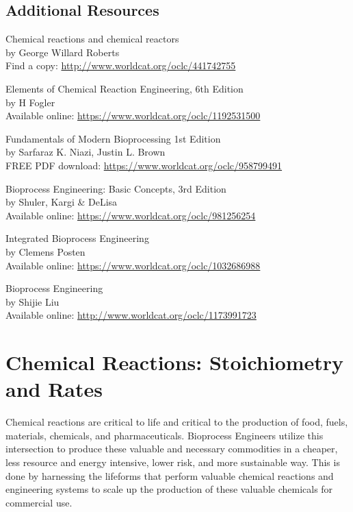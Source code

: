 \documentclass[
]{article}
\begin{document}
\hypertarget{additional-resources}{%
\subsection{Additional Resources}\label{additional-resources}}

Chemical reactions and chemical reactors\\
by George Willard Roberts\\
Find a copy: \url{http://www.worldcat.org/oclc/441742755}

Elements of Chemical Reaction Engineering, 6th Edition\\
by H Fogler\\
Available online: \url{https://www.worldcat.org/oclc/1192531500}

Fundamentals of Modern Bioprocessing 1st Edition\\
by Sarfaraz K. Niazi, Justin L. Brown\\
FREE PDF download: \url{https://www.worldcat.org/oclc/958799491}

Bioprocess Engineering: Basic Concepts, 3rd Edition\\
by Shuler, Kargi \& DeLisa\\
Available online: \url{https://www.worldcat.org/oclc/981256254}

Integrated Bioprocess Engineering\\
by Clemens Posten\\
Available online: \url{https://www.worldcat.org/oclc/1032686988}

Bioprocess Engineering\\
by Shijie Liu\\
Available online: \url{http://www.worldcat.org/oclc/1173991723}

\hypertarget{chemical-reactions-stoichiometry-and-rates}{%
\section{Chemical Reactions: Stoichiometry and Rates}\label{chemical-reactions-stoichiometry-and-rates}}

Chemical reactions are critical to life and critical to the production of food, fuels, materials, chemicals, and pharmaceuticals. Bioprocess Engineers utilize this intersection to produce these valuable and necessary commodities in a cheaper, less resource and energy intensive, lower risk, and more sustainable way. This is done by harnessing the lifeforms that perform valuable chemical reactions and engineering systems to scale up the production of these valuable chemicals for commercial use.
\end{document}
